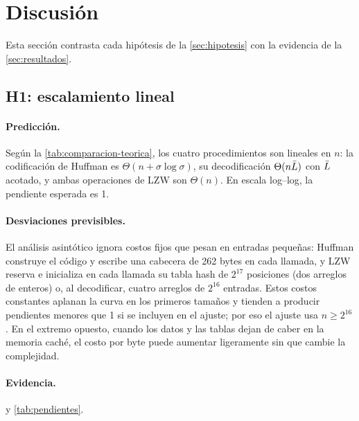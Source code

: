 \section{Discusión}
\label{sec:discusion}

Esta sección contrasta cada hipótesis de la \cref{sec:hipotesis} con la evidencia de la
\cref{sec:resultados}.

\subsection{H1: escalamiento lineal}
\label{sec:disc-h1}
\paragraph{Predicción.} Según la \cref{tab:comparacion-teorica}, los cuatro procedimientos son
lineales en $n$: la codificación de Huffman es $\Theta(n + \sigma\log\sigma)$, su
decodificación $\Theta(n\bar{L})$ con $\bar{L}$ acotado, y ambas operaciones de LZW son
$\Theta(n)$. En escala log--log, la pendiente esperada es 1.

\paragraph{Desviaciones previsibles.} El análisis asintótico ignora costos fijos que pesan en
entradas pequeñas: Huffman construye el código y escribe una cabecera de 262 bytes en cada
llamada, y LZW reserva e inicializa en cada llamada su tabla hash de $2^{17}$ posiciones (dos
arreglos de enteros) o, al decodificar, cuatro arreglos de $2^{16}$ entradas. Estos costos
constantes aplanan la curva en los primeros tamaños y tienden a producir pendientes menores
que 1 si se incluyen en el ajuste; por eso el ajuste usa $n \ge 2^{16}$. En el extremo opuesto,
cuando los datos y las tablas dejan de caber en la memoria caché, el costo por byte puede
aumentar ligeramente sin que cambie la complejidad.

\paragraph{Evidencia.}  y \cref{tab:pendientes}.
